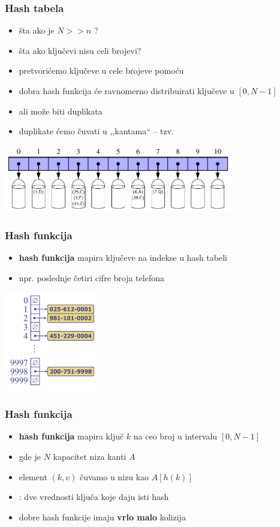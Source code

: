 \documentclass[compress]{beamer}
\begin{document}
\begin{frame}[fragile]
  \frametitle{Hash tabela}
  \begin{itemize}
    \item šta ako je $N >> n$ ?  
    \item šta ako ključevi nisu celi brojevi?
    \item pretvorićemo ključeve u cele brojeve pomoću 
    \item dobra hash funkcija će ravnomerno distribuirati ključeve u $[0,N-1]$
    \item ali može biti duplikata
    \item duplikate ćemo čuvati u ,,kantama`` -- tzv. 
  \end{itemize}
  \begin{center}
    \includegraphics[width=10cm]{asp-10-pic05.pdf}
  \end{center}
\end{frame}

\begin{frame}[fragile]
  \frametitle{Hash funkcija}
  \begin{itemize}
    \item \textbf{hash funkcija} mapira ključeve na indekse u hash tabeli  
    \item npr. poslednje četiri cifre broja telefona
  \end{itemize}
  \begin{center}
    \includegraphics[width=4cm]{asp-10-pic06.png}
  \end{center}
\end{frame}

\begin{frame}[fragile]
  \frametitle{Hash funkcija}
  \begin{itemize}
    \item \textbf{hash funkcija} mapira ključ $k$ na ceo broj u intervalu $[0,N-1]$
    \item gde je $N$ kapacitet niza kanti $A$
    \item element $(k,v)$ čuvamo u nizu kao $A[h(k)]$
    \item {}: dve vrednosti ključa koje daju isti hash
    \item dobre hash funkcije imaju \textbf{vrlo malo} kolizija
  \end{itemize}
\end{frame}
\end{document}
